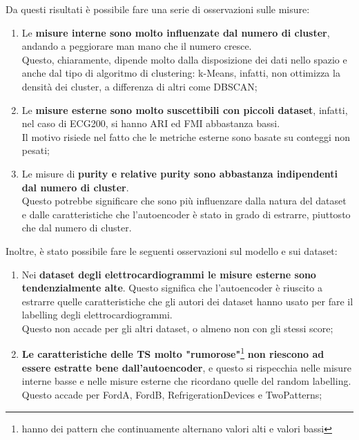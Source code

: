 Da questi risultati è possibile fare una serie di osservazioni sulle misure:
\begin{enumerate}
	\item Le \textbf{misure interne sono molto influenzate dal numero di cluster}, andando a peggiorare man mano che il numero cresce.\\
	Questo, chiaramente, dipende molto dalla disposizione dei dati nello spazio e anche dal tipo di algoritmo di clustering: k-Means, infatti, non ottimizza la densità dei cluster, a differenza di altri come DBSCAN;
	\item Le \textbf{misure esterne sono molto suscettibili con piccoli dataset}, infatti, nel caso di ECG200, si hanno ARI ed FMI abbastanza bassi.\\
	Il motivo risiede nel fatto che le metriche esterne sono basate su conteggi non pesati;
	\item Le misure di \textbf{purity e relative purity sono abbastanza indipendenti dal numero di cluster}.\\
	Questo potrebbe significare che sono più influenzare dalla natura del dataset e dalle caratteristiche che l'autoencoder è stato in grado di estrarre, piuttosto che dal numero di cluster.
\end{enumerate}

Inoltre, è stato possibile fare le seguenti osservazioni sul modello e sui dataset:
\begin{enumerate}	
	\item Nei \textbf{dataset degli elettrocardiogrammi le misure esterne sono tendenzialmente alte}. Questo significa che l'autoencoder è riuscito a estrarre quelle caratteristiche che gli autori dei dataset hanno usato per fare il labelling degli elettrocardiogrammi.\\
	Questo non accade per gli altri dataset, o almeno non con gli stessi score;
	\item \textbf{Le caratteristiche delle TS molto "rumorose"}\footnote{hanno dei pattern che continuamente alternano valori alti e valori bassi} \textbf{non riescono ad essere estratte bene dall'autoencoder}, e questo si rispecchia nelle misure interne basse e nelle misure esterne che ricordano quelle del random labelling. Questo accade per FordA, FordB, RefrigerationDevices e TwoPatterns;
\end{enumerate}